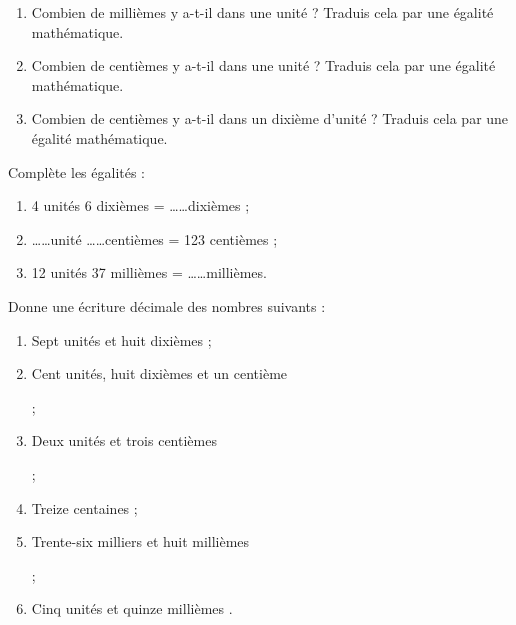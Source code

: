 \begin{exercice}
\begin{enumerate}
 \item Combien de millièmes y a-t-il dans une unité ?
Traduis cela par une égalité mathématique.
 \item Combien de centièmes y a-t-il dans une unité ? Traduis cela par une égalité mathématique.
 \item Combien de centièmes y a-t-il dans un dixième d'unité ? Traduis cela par une égalité mathématique.
 \end{enumerate}
\end{exercice}


\begin{exercice}
Complète les égalités :
\begin{enumerate}
 \item 4 unités 6 dixièmes = \ldots \ldots dixièmes ;
 \item  \ldots \ldots  unité \ldots \ldots centièmes = 123 centièmes ;
 \item 12 unités 37 millièmes = \ldots \ldots millièmes.
 \end{enumerate}
\end{exercice}


\begin{exercice}
Donne une écriture décimale des nombres suivants :
\begin{enumerate}
 \item Sept unités et huit dixièmes \dotfill ;
 \item Cent unités, huit dixièmes et un centième
 
 \dotfill ;
 \item Deux unités et trois centièmes
 
 \dotfill ;
 \item Treize centaines \dotfill ;
 \item Trente-six milliers et huit millièmes
 
 \dotfill ;
 \item Cinq unités et quinze millièmes \dotfill.
 \end{enumerate}
\end{exercice}


